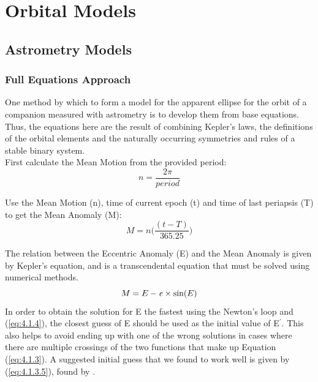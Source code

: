 \documentclass[12pt,preprint]{aastex}
\begin{document}



\section{Orbital Models}

\subsection{Astrometry Models}\label{sec:DI-OrbModels}

\subsubsection{Full Equations Approach}

One method by which to form a model for the apparent ellipse for the orbit of a companion measured with astrometry is to develop them from base equations.  Thus, the equations here are the result of combining Kepler's laws, the definitions of the orbital elements and the naturally occurring symmetries and rules of a stable binary system.\\

First calculate the Mean Motion from the provided period:
\begin{equation}\label{eq:4.1.1}
n = \frac{2\pi}{period} 
\end{equation}

Use the Mean Motion (n), time of current epoch (t) and time of last periapsis (T) to get the Mean Anomaly (M):
\begin{equation}\label{eq:4.1.2}
M = n \bigg( \frac{(t-T)}{365.25} \bigg)
\end{equation}

The relation between the Eccentric Anomaly (E) and the Mean Anomaly is given by Kepler's equation, and is a transcendental equation that must be solved using numerical methods.
\begin{equation}\label{eq:4.1.3}
M = E - {\it e}\times\sin(E)
\end{equation}
In order to obtain the solution for E the fastest using the Newton's loop and (\ref{eq:4.1.4}), the closest guess of E should be used as the initial value of E$^{\prime}$.  This also helps to avoid ending up with one of the wrong solutions in cases where there are multiple crossings of the two functions that make up Equation (\ref{eq:4.1.3}).  A suggested initial guess that we found to work well is given by (\ref{eq:4.1.3.5}), found by \citep{Argyle}.
\end{document}

